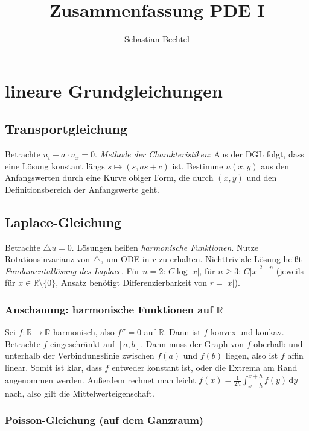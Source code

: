 \documentclass[11pt,a4paper]{scrartcl}
\newcommand{\R}{\mathbb{R}} %
\newcommand{\laplace}{\triangle}
\theoremstyle{plain}
\theoremstyle{definition}
\theoremstyle{remark}
\begin{document}
\title{Zusammenfassung PDE I}
\author{Sebastian Bechtel}
\maketitle

\section{lineare Grundgleichungen}

\subsection{Transportgleichung}

Betrachte $u_t + a\cdot u_x = 0$. \emph{Methode der Charakteristiken}: Aus der DGL folgt, dass eine Lösung konstant längs $s\mapsto (s,as+c)$ ist. Bestimme $u(x,y)$ aus den Anfangswerten durch eine Kurve obiger Form, die durch $(x,y)$ und den Definitionsbereich der Anfangswerte geht.

\subsection{Laplace-Gleichung}

Betrachte $\laplace u = 0$. Lösungen heißen \emph{harmonische Funktionen}. Nutze Rotationsinvarianz von $\laplace$, um ODE in $r$ zu erhalten. Nichttriviale Lösung heißt \emph{Fundamentallösung des Laplace}. Für $n=2$: $C \log |x|$, für $n \geq 3$: $C |x|^{2-n}$ (jeweils für $x\in \R \setminus \{0\}$, Ansatz benötigt Differenzierbarkeit von $r=|x|$).

\subsubsection{Anschauung: harmonische Funktionen auf $\R$}

Sei $f: \R \to \R$ harmonisch, also $f''=0$ auf $\R$. Dann ist $f$ konvex und konkav. Betrachte $f$ eingeschränkt auf $[a,b]$. Dann muss der Graph von $f$ oberhalb und unterhalb der Verbindungslinie zwischen $f(a)$ und $f(b)$ liegen, also ist $f$ affin linear. Somit ist klar, dass $f$ entweder konstant ist, oder die Extrema am Rand angenommen werden. Außerdem rechnet man leicht $f(x)=\frac{1}{2h} \int_{x-h}^{x+h} f(y) \, \mathrm{d}y$ nach, also gilt die Mittelwerteigenschaft.

\subsubsection{Poisson-Gleichung (auf dem Ganzraum)}
\end{document}
